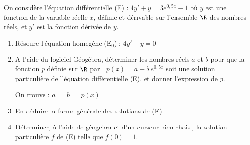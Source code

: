 On considère l’équation différentielle (E) : $4y' + y = 3e^{0,5x}-1$ où $y$ est une fonction de la variable réelle $x$, définie et dérivable sur l’ensemble $\R$ des nombres réels, et $y'$ est la fonction dérivée de $y$.

\begin{enumerate}
	\item Résoure l'équation homogène (E$_0$) : $4y'+y=0$\sautp

	\item A l’aide du logiciel Géogébra, déterminer les nombres réels $a$ et $b$ pour que la fonction $p$ définie sur $\R$ par : $p(x) = a + b~e^{0,5x}$ soit une solution particulière de l'équation différentielle (E), et donner l’expression de $p$. \par \medskip
	
	On trouve : $a=$\makebox[0.1\linewidth]{\dotfill} \hfill $b=$\makebox[0.1\linewidth]{\dotfill} \hfill $p(x)=$\makebox[0.3\linewidth]{\dotfill} \sauts
	\item En déduire la forme générale des solutions de (E).\sautp

	\item Déterminer, à l'aide de géogebra et d'un curseur bien choisi, la solution particulière $f$ de (E) telle que $f(0)=1$.\sautp

\end{enumerate}